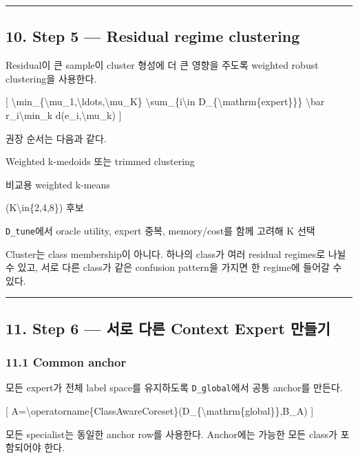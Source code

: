 \medskip\hrule\medskip
\subsection{10. Step 5 — Residual regime clustering}
Residual이 큰 sample이 cluster 형성에 더 큰 영향을 주도록 weighted robust clustering을 사용한다.

[ \textbackslash{}min\_\allowbreak{}\{\textbackslash{}mu\_\allowbreak{}1,\textbackslash{}ldots,\textbackslash{}mu\_\allowbreak{}K\} \textbackslash{}sum\_\allowbreak{}\{i\textbackslash{}in D\_\allowbreak{}\{\textbackslash{}mathrm\{expert\}\}\} \textbackslash{}bar r\_\allowbreak{}i\textbackslash{}min\_\allowbreak{}k d(e\_\allowbreak{}i,\textbackslash{}mu\_\allowbreak{}k) ]

권장 순서는 다음과 같다.

\par\noindent \textbullet\enspace Weighted k-medoids 또는 trimmed clustering


\par\noindent \textbullet\enspace 비교용 weighted k-means


\par\noindent \textbullet\enspace (K\textbackslash{}in\{2,4,8\}) 후보


\par\noindent \textbullet\enspace \texttt{D\_\allowbreak{}\allowbreak{}tune}에서 oracle utility, expert 중복, memory/\allowbreak{}cost를 함께 고려해 K 선택


Cluster는 class membership이 아니다. 하나의 class가 여러 residual regimes로 나뉠 수 있고, 서로 다른 class가 같은 confusion pattern을 가지면 한 regime에 들어갈 수 있다.


\medskip\hrule\medskip
\subsection{11. Step 6 — 서로 다른 Context Expert 만들기}
\subsubsection{11.1 Common anchor}
모든 expert가 전체 label space를 유지하도록 \texttt{D\_\allowbreak{}\allowbreak{}global\allowbreak{}}에서 공통 anchor를 만든다.

[ A=\allowbreak{}\textbackslash{}operatorname\{ClassAwareCoreset\}(D\_\allowbreak{}\{\textbackslash{}mathrm\{global\}\},B\_\allowbreak{}A) ]

모든 specialist는 동일한 anchor row를 사용한다. Anchor에는 가능한 모든 class가 포함되어야 한다.


